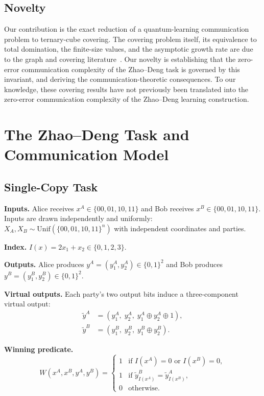 \documentclass[11pt,letterpaper]{article}
\newcommand{\ytildeA}{\tilde{y}^{A}}
\newcommand{\ytildeB}{\tilde{y}^{B}}
\newcommand{\xor}{\oplus}
\begin{document}
\subsection{Novelty}

Our contribution is the exact reduction of a quantum-learning communication problem to ternary-cube covering. The covering problem itself, its equivalence to total domination, the finite-size values, and the asymptotic growth rate are due to the graph and covering literature~\cite{adriaensen2026,kuangwang2026}. Our novelty is establishing that the zero-error communication complexity of the Zhao--Deng task is governed by this invariant, and deriving the communication-theoretic consequences. To our knowledge, these covering results have not previously been translated into the zero-error communication complexity of the Zhao--Deng learning construction.

\section{The Zhao--Deng Task and Communication Model}
\label{sec:task}

\subsection{Single-Copy Task}

\textbf{Inputs.} Alice receives $x^A \in \{00,01,10,11\}$ and Bob receives $x^B \in \{00,01,10,11\}$. Inputs are drawn independently and uniformly: $X_A, X_B \sim \mathrm{Unif}(\{00,01,10,11\}^n)$ with independent coordinates and parties.

\textbf{Index.} $I(x) = 2x_1 + x_2 \in \{0,1,2,3\}$.

\textbf{Outputs.} Alice produces $y^A = (y_1^A, y_2^A) \in \{0,1\}^2$ and Bob produces $y^B = (y_1^B, y_2^B) \in \{0,1\}^2$.

\textbf{Virtual outputs.} Each party's two output bits induce a three-component virtual output:
\begin{align*}
  \ytildeA &= (y_1^A,\; y_2^A,\; y_1^A \xor y_2^A \xor 1), \\
  \ytildeB &= (y_1^B,\; y_2^B,\; y_1^B \xor y_2^B).
\end{align*}

\textbf{Winning predicate.}
\[
  W(x^A, x^B, y^A, y^B) =
  \begin{cases}
    1 & \text{if } I(x^A)=0 \text{ or } I(x^B)=0, \\
    1 & \text{if } \ytildeB_{I(x^A)} = \ytildeA_{I(x^B)}, \\
    0 & \text{otherwise.}
  \end{cases}
\]
\end{document}
